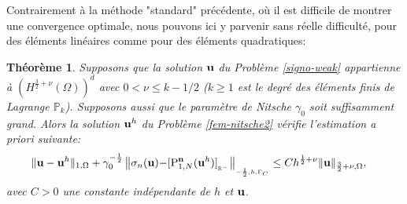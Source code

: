 \documentclass[11pt]{book}
\newtheorem{theorem}{Théorème}[section]
\newcommand{\bt}{\begin{theorem}}
\newcommand{\et}{\end{theorem}}
\newcommand{\cqfd}{{$\mbox{}$\hfill$\square$}}
\def\u{{\bf u}}
\def\n{{\bf n}}
\def\vv{{\bf v}}
\newcommand{\caT}{{\cal T}}
\newcommand{\R}{\mathbb{R}}
\newcommand{\PP}{\mathbb{P}}
\newcommand{\Gc}{\Gamma_{C}}
\newcommand{\sn}{{\sigma_n}}
\newcommand{\Pgh}{P_{\gamma}}
\newcommand{\PNgh}{\mathrm{P}^{\n}_{1, N}}
\newcommand{\Nngc}[1]{\left \|{#1} \right \|_{_{-\frac12,h,\Gc}}}
\newcommand{\pns}[1]{ [ #1 ]_{_{\R^-}}}
\begin{document}
% 

\medskip

Contrairement à la méthode "standard" précédente, où il est difficile de montrer une convergence optimale, nous pouvons ici y parvenir sans réelle difficulté, pour des éléments linéaires comme pour des éléments quadratiques:

\bt
\label{cvnitsche2t}
Supposons que la  solution $\u$ du Problème \eqref{signo-weak} appartienne à
$(H^{\frac32+\nu} (\Omega))^d$ avec $0 < \nu \le k-1/2$ ($k\geq1$ est le degré des éléments finis de Lagrange $\PP_k$).
Supposons aussi que le paramètre de Nitsche $\gamma_0$ soit suffisamment grand.
Alors la solution $\u^h$ 
du Problème \eqref{fem-nitsche2}
vérifie l'estimation \emph{a priori} suivante:
\begin{align}
\label{estfinale}
\begin{aligned}
& \| \u - \u^h \|_{1,\Omega} 
+
\gamma_0^{-\frac12} %
\Nngc{\sn(\u) {- \pns{\PNgh (\u^h)}} }
%
 \leq C %
h^{\frac12+\nu} %
   \| \u \|_{\frac32+\nu,\Omega},
\end{aligned}
\end{align}
avec $C > 0$ une constante indépendante de $h$ et $\u$.
\et
\end{document}
